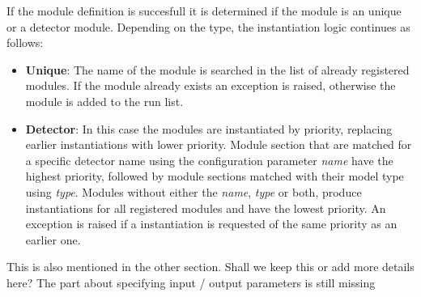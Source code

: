 If the module definition is succesfull it is determined if the module is an unique or a detector module. Depending on the type, the instantiation logic continues as follows:
\begin{itemize}
\item \textbf{Unique}: The name of the module is searched in the list of already registered modules. If the module already exists an exception is raised, otherwise the module is added to the run list.
\item \textbf{Detector}: In this case the modules are instantiated by priority, replacing earlier instantiations with lower priority. Module section that are matched for a specific detector name using the configuration parameter \textit{name} have the highest priority, followed by module sections matched with their model type using \textit{type}. Modules without either the \textit{name}, \textit{type} or both, produce instantiations for all registered modules and have the lowest priority. An exception is raised if a instantiation is requested of the same priority as an earlier one.
\end{itemize}

\todo This is also mentioned in the other section. Shall we keep this or add more details here? The part about specifying input / output parameters is still missing \todo

